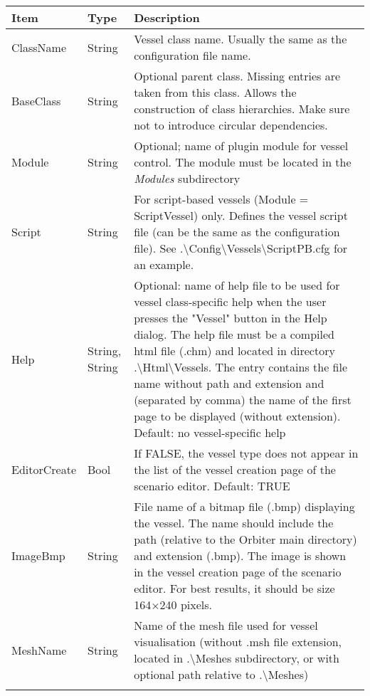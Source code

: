 \documentclass[Orbiter Developer Manual.tex]{subfiles}
\begin{document}
	\begin{longtable}{ |p{}|p{}|p{}| }
	\hline\rule{0pt}{2ex}
	\textbf{Item} & \textbf{Type} & \textbf{Description}\\
	\hline\rule{0pt}{2ex}
	ClassName & String & Vessel class name. Usually the same as the configuration file name.\\
	\hline\rule{0pt}{2ex}
	BaseClass & String & Optional parent class. Missing entries are taken from this class. Allows the construction of class hierarchies. Make sure not to introduce circular dependencies.\\
	\hline\rule{0pt}{2ex}
	Module & String & Optional; name of plugin module for vessel control. The module must be located in the \textit{Modules} subdirectory\\
	\hline\rule{0pt}{2ex}
	Script & String & For script-based vessels (Module = ScriptVessel) only. Defines the vessel script file (can be the same as the configuration file). See .\textbackslash Config\textbackslash Vessels\textbackslash ScriptPB.cfg for an example.\\
	\hline\rule{0pt}{2ex}
	Help & String, String & Optional: name of help file to be used for vessel class-specific help when the user presses the "Vessel" button in the Help dialog. The help file must be a compiled html file (.chm) and located in directory .\textbackslash Html\textbackslash Vessels. The entry contains the file name without path and extension and (separated by comma) the name of the first page to be displayed (without extension). Default: no vessel-specific help\\
	\hline\rule{0pt}{2ex}
	EditorCreate & Bool & If FALSE, the vessel type does not appear in the list of the vessel creation page of the scenario editor. Default: TRUE\\
	\hline\rule{0pt}{2ex}
	ImageBmp & String & File name of a bitmap file (.bmp) displaying the vessel. The name should include the path (relative to the Orbiter main directory) and extension (.bmp). The image is shown in the vessel creation page of the scenario editor. For best results, it should be size 164×240 pixels.\\
	\hline\rule{0pt}{2ex}
	MeshName & String & Name of the mesh file used for vessel visualisation (without .msh file extension, located in .\textbackslash Meshes subdirectory, or with optional path relative to .\textbackslash Meshes)\\
	\hline\rule{0pt}{2ex}

\end{longtable}
\end{document}
